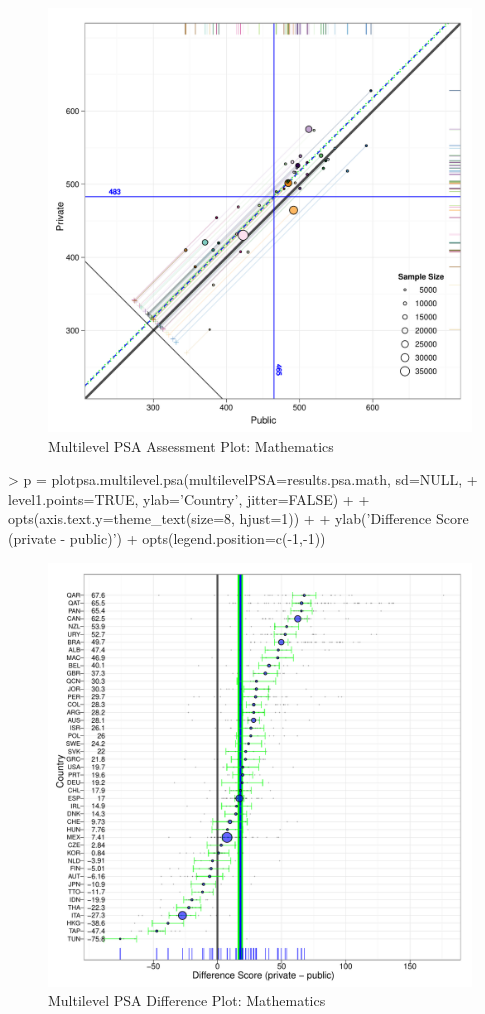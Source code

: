 \documentclass[letterpaper,11pt]{article}
\begin{document}
\clearpage
\begin{figure}[tp]
\begin{center}
\includegraphics{multilevelPSA-021}
\caption{Multilevel PSA Assessment Plot: Mathematics}
\label{fig:circpsamath}
\end{center}
\end{figure}

\begin{Schunk}
\begin{Sinput}
> p = plotpsa.multilevel.psa(multilevelPSA=results.psa.math, sd=NULL, 
+ level1.points=TRUE, ylab='Country', jitter=FALSE) + 
+ opts(axis.text.y=theme_text(size=8, hjust=1)) + 
+ ylab('Difference Score (private - public)') + opts(legend.position=c(-1,-1))
\end{Sinput}
\end{Schunk}

\clearpage
\begin{figure}[tp]
\begin{center}
\includegraphics{multilevelPSA-023}
\caption{Multilevel PSA Difference Plot: Mathematics}
\label{fig:diffpsamath}
\end{center}
\end{figure}
\end{document}
